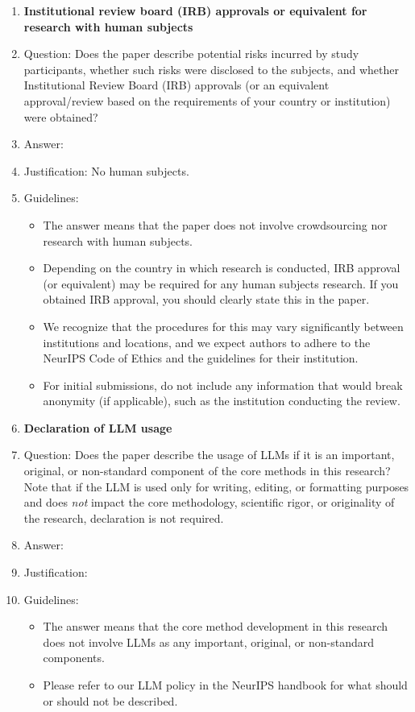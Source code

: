 \documentclass{article}
\numberwithin{theorem}{section}
\theoremstyle{definition}
\begin{document}
\begin{enumerate}
\item {\bf Institutional review board (IRB) approvals or equivalent for research with human subjects}
    \item[] Question: Does the paper describe potential risks incurred by study participants, whether such risks were disclosed to the subjects, and whether Institutional Review Board (IRB) approvals (or an equivalent approval/review based on the requirements of your country or institution) were obtained?
    \item[] Answer: \answerNA{} %
    \item[] Justification: No human subjects.
    \item[] Guidelines:
    \begin{itemize}
        \item The answer \answerNA{} means that the paper does not involve crowdsourcing nor research with human subjects.
        \item Depending on the country in which research is conducted, IRB approval (or equivalent) may be required for any human subjects research. If you obtained IRB approval, you should clearly state this in the paper. 
        \item We recognize that the procedures for this may vary significantly between institutions and locations, and we expect authors to adhere to the NeurIPS Code of Ethics and the guidelines for their institution. 
        \item For initial submissions, do not include any information that would break anonymity (if applicable), such as the institution conducting the review.
    \end{itemize}

\item {\bf Declaration of LLM usage}
    \item[] Question: Does the paper describe the usage of LLMs if it is an important, original, or non-standard component of the core methods in this research? Note that if the LLM is used only for writing, editing, or formatting purposes and does \emph{not} impact the core methodology, scientific rigor, or originality of the research, declaration is not required.
    \item[] Answer: \answerNA{} %
    \item[] Justification: \item[] Guidelines:
    \begin{itemize}
        \item The answer \answerNA{} means that the core method development in this research does not involve LLMs as any important, original, or non-standard components.
        \item Please refer to our LLM policy in the NeurIPS handbook for what should or should not be described.
    \end{itemize}

\end{enumerate}
\end{document}

